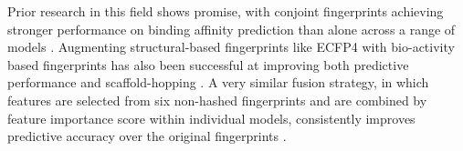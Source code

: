 
Prior research in this field shows promise, with conjoint fingerprints achieving stronger performance on binding affinity prediction than alone across a range of models \citep{Xie2020}. Augmenting structural-based fingerprints like ECFP4 with bio-activity based fingerprints has also been successful at improving both predictive performance and scaffold-hopping \citep{Laufktter2019}. A very similar fusion strategy, in which features are selected from six non-hashed fingerprints and are combined by feature importance score within individual models, consistently improves predictive accuracy over the original fingerprints \citep{Turkina2025}. 

